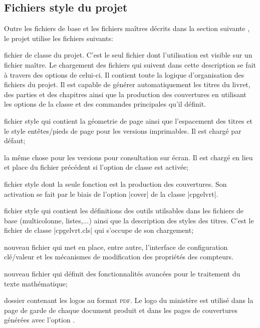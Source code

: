 \documentclass[other,openany]{cpgelvrt}
\let\OPT\opt
\renewcommand\opt[1]{{\spotcolor\OPT{#1}}}
\let\STY\sty
\renewcommand\sty[1]{{\color{fs}\STY{#1}}}
\begin{document}
\subsection{Fichiers style du projet} \label{sec:files}
Outre les fichiers de base et les fichiers maîtres décrits dans la section suivante , le projet utilise les fichiers suivants: 
\begin{description}[font=\sty, itemindent=-1em]
\item [cpgelvrt.cls] fichier de classe du projet. C'est le seul fichier dont l'utilisation est visible sur un fichier maître. Le chargement des fichiers qui suivent dans cette description se fait à travers des options de celui-ci. Il contient toute la logique d'organisation des fichiers du projet. Il est capable de générer automatiquement les titres du livret, des parties et des chapitres ainsi que la production des couvertures en utilisant les options de la classe et  des commandes principales qu'il définit.
\item [lvrtprint.sty] fichier style qui contient la géometrie de page ainsi que l'espacement des titres et le style entêtes/pieds de page pour les versions imprimables. Il est chargé par défaut; 
\item [lvrtscreen.sty] la même chose pour les versions pour consultation sur écran. Il est chargé en lieu et place du fichier précédent si l'option de classe  est activée; 
\item[lvrtcover.sty] fichier style dont la seule fonction est la production des couvertures. Son activation se fait par le biais de l'option |cover| de la classe  |cpgelvrt|. 
\item[lvrtcommon.sty] fichier style qui contient les définitions des outils utilsables dans les fichiers de base (multicolonne, listes,...) ainsi que la description des styles des titres. C'est le fichier de classe |cpgelvrt.cls| qui s'occupe de son chargement;
\item[lvrtbase.sty] nouveau fichier qui met en place, entre autre, l'interface de configuration clé/valeur et les mécanismes de modification des propriétés des compteurs.  
\item[lvrtmath.sty] nouveau fichier qui définit des fonctionnalités avancées pour le traitement du texte mathématique; 
\item [Logos] dossier contenant les logos au format \textsc{pdf}. Le logo du ministère est utilisé dans la page de garde de chaque document produit et dans les pages de couvertures générées avec l'option .
\end{description}
\end{document}
